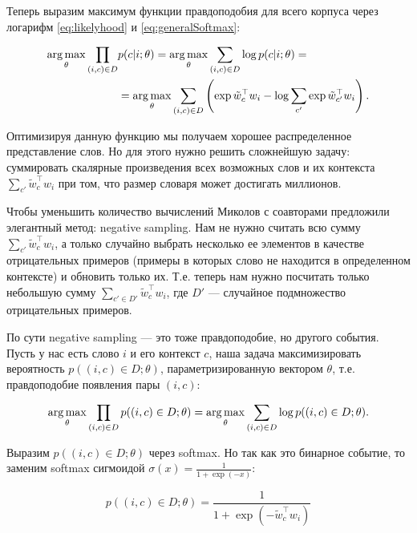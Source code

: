 \bigskip
Теперь выразим максимум функции правдоподобия для всего корпуса через логарифм \ref{eq:likelyhood} и \ref{eq:generalSoftmax}:

\begin{equation}
\begin{aligned}
 \operatorname*{arg\,max}_{\theta} \prod_{(i,c)\in D} & p(c|i;\theta) = \operatorname*{arg\,max}_{\theta} \sum_{(i,c)\in D}\log{p(c|i;\theta)} = \\
 & = \operatorname*{arg\,max}_{\theta} \sum_{(i,c)\in D} \left(\exp{\tilde{w}_c^\top w_i} - \log{\sum_{c'} \exp{\tilde{w}_{c'}^\top w_i}}\right).
\end{aligned}
\end{equation}

Оптимизируя данную функцию мы получаем хорошее распределенное представление слов. Но для этого нужно решить сложнейшую задачу: суммировать скалярные произведения всех возможных слов и их контекста $\sum_{c'} \tilde{w}_c^\top w_i$ при том, что размер словаря может достигать миллионов.

\bigskip
Чтобы уменьшить количество вычислений Миколов с соавторами \cite{Mikolov:2} предложили элегантный метод: negative sampling. Нам не нужно считать всю сумму $\sum_{c'} \tilde{w}_c^\top w_i$, а только случайно выбрать несколько ее элементов в качестве отрицательных примеров (примеры в которых слово не находится в определенном контексте) и обновить только их. Т.е. теперь нам нужно посчитать только небольшую сумму $\sum_{c' \in D'} \tilde{w}_c^\top w_i$, где $D'$ --- случайное подмножество отрицательных примеров.

\bigskip
По сути negative sampling --- это тоже правдоподобие, но другого события. Пусть у нас есть слово $i$ и его контекст $c$, наша задача максимизировать вероятность $p((i,c) \in D; \theta)$, параметризированную вектором $\theta$, т.е. правдоподобие появления пары $(i,c)$:

\begin{equation}
 \operatorname*{arg\,max}_{\theta} \prod_{(i,c)\in D} p((i,c)\in D;\theta) = \operatorname*{arg\,max}_{\theta} \sum_{(i,c)\in D} \log{ p((i,c)\in D;\theta)}.
\end{equation}

Выразим $p((i,c)\in D;\theta)$ через softmax. Но так как это бинарное событие, то заменим softmax сигмоидой $\sigma (x) = \frac{1}{1+\exp{(-x)}}$:

\begin{equation}
 p((i,c)\in D;\theta) = \frac{1}{1+\exp{(-\tilde{w}_c^{\top} w_i)}}
\end{equation}

